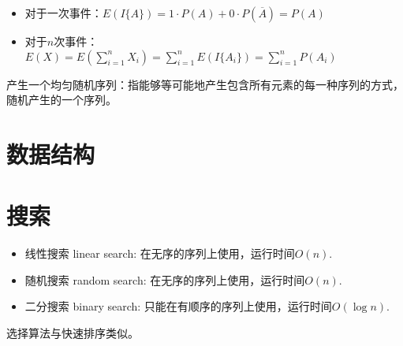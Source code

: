 \begin{itemize}
    \item 对于一次事件：$E(I\{A\}) = 1 \cdot P(A) + 0 \cdot P(\overline A) = P(A)$
    \item 对于$n$次事件：$E(X) = E(\displaystyle \sum _{i=1}^n X_i) = \sum _{i=1}^n E(I\{A_i\}) = \sum _{i=1}^n P(A_i)$
\end{itemize}

产生一个均匀随机序列：指能够等可能地产生包含所有元素的每一种序列的方式，随机产生的一个序列。

\section{数据结构}

\section{搜索}
\begin{itemize}
    \item 线性搜索 linear search: 在无序的序列上使用，运行时间$O (n)$.
    \item 随机搜索 random search: 在无序的序列上使用，运行时间$O (n)$.
    \item 二分搜索 binary search: 只能在有顺序的序列上使用，运行时间$O (\log n)$.
\end{itemize}
选择算法与快速排序类似。

